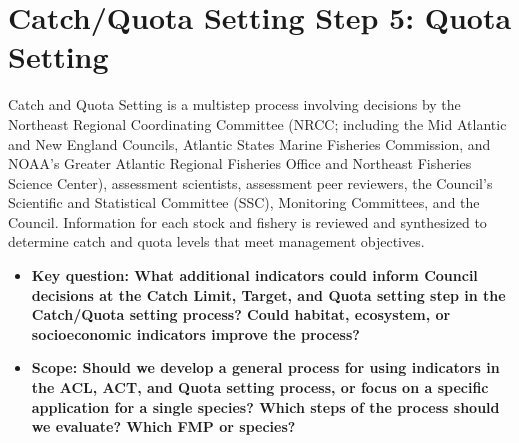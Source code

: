 \documentclass[
]{article}
\author{}
\date{\vspace{-2.5em}}
\providecommand{\tightlist}{%
  \setlength{\itemsep}{0pt}\setlength{\parskip}{0pt}}
\begin{document}
\vspace{-1cm}

\section{Catch/Quota Setting Step 5: Quota
Setting}\label{catchquota-setting-step-5-quota-setting}

\begin{noteblock}
Catch and Quota Setting is a multistep process involving decisions by
the Northeast Regional Coordinating Committee (NRCC; including the Mid
Atlantic and New England Councils, Atlantic States Marine Fisheries
Commission, and NOAA's Greater Atlantic Regional Fisheries Office and
Northeast Fisheries Science Center), assessment scientists, assessment
peer reviewers, the Council's Scientific and Statistical Committee
(SSC), Monitoring Committees, and the Council. Information for each
stock and fishery is reviewed and synthesized to determine catch and
quota levels that meet management objectives.

\end{noteblock}

\begin{itemize}
\tightlist
\item
  \textbf{Key question: What additional indicators could inform Council
  decisions at the Catch Limit, Target, and Quota setting step in the
  Catch/Quota setting process? Could habitat, ecosystem, or
  socioeconomic indicators improve the process?}
\item
  \textbf{Scope: Should we develop a general process for using
  indicators in the ACL, ACT, and Quota setting process, or focus on a
  specific application for a single species? Which steps of the process
  should we evaluate? Which FMP or species?}
\end{itemize}
\end{document}

